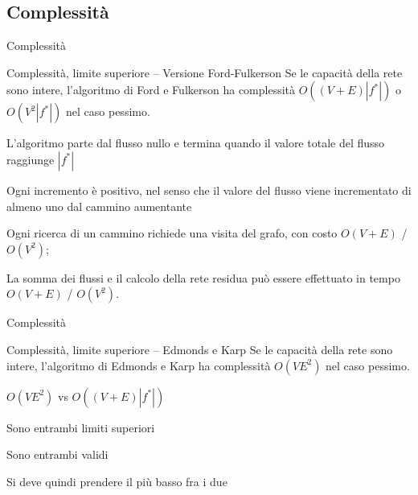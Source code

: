 \subsection{Complessità}


\begin{frame}{Complessità}

\begin{block}{Complessità, limite superiore -- Versione Ford-Fulkerson}
Se le capacità della rete sono intere, l'algoritmo di Ford e Fulkerson
ha complessità $O((V+E)|f^*|)$ o $O(V^2|f^*|)$ nel caso pessimo.
\end{block}

\BIL
\item L'algoritmo parte dal flusso nullo e termina quando il valore totale
del flusso raggiunge $|f^*|$
\item Ogni incremento è positivo, nel senso che il valore del flusso viene 
incrementato di almeno uno dal cammino aumentante
\item Ogni ricerca di un cammino richiede una visita del grafo, con
costo $O(V+E)$ / $O(V^2)$; 
\item La somma dei flussi e il calcolo della rete residua può essere 
effettuato in tempo $O(V+E)$ / $O(V^2)$.
\EIL

\end{frame}

\begin{frame}{Complessità}

\begin{block}{Complessità, limite superiore -- Edmonds e Karp}
Se le capacità della rete sono intere, l'algoritmo di Edmonds e Karp
ha complessità $O(VE^2)$ nel caso pessimo.
\end{block}

\bigskip
{}

\BIL
\item $O(VE^2)$ vs $O((V+E)|f^*|)$
\item Sono entrambi limiti superiori
\item Sono entrambi validi
\item Si deve quindi prendere il più basso fra i due
\EIL

\end{frame}

